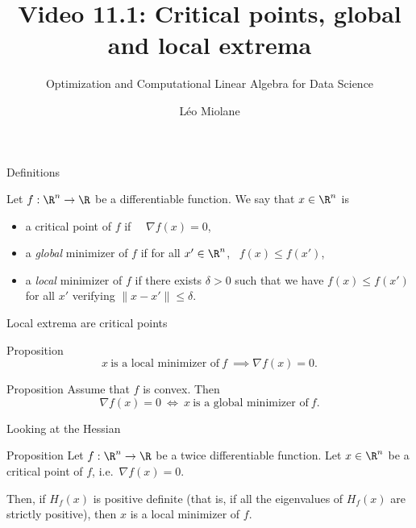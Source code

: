 \documentclass{beamer}
\title{Video 11.1: Critical points, global and local extrema}
\subtitle{Optimization and Computational Linear Algebra for Data Science}
\author{Léo Miolane}
\date{}
\begin{document}
\setcounter{showProgressBar}{0}
\setcounter{showSlideNumbers}{0}

\frame{\titlepage}
\setcounter{framenumber}{0}
\setcounter{showSlideNumbers}{1}




\begin{frame}[t]{Definitions}
	\grid

	\vspace{-0.2cm}
	\begin{definition}
		Let $f: \R^n \to \R$ be a differentiable function.
		We say that $x \in \R^n$ is
		\begin{itemize}
			\item a critical point of $f$ if \ \ $\nabla f(x) = 0$,
			\item a \emph{global} minimizer of $f$ if for all $x' \in \R^n$, \ $f(x) \leq f(x')$,
			\item a \emph{local} minimizer of $f$ if there exists $\delta > 0$ such that we have $f(x) \leq f(x')$ for all $x'$ verifying $\|x-x'\| \leq \delta$.
		\end{itemize}

	\end{definition}

\end{frame}

\begin{frame}[t]{Local extrema are critical points}
	\grid

	\vspace{-0.2cm}
	\begin{block}{Proposition}
	\vspace{-0.2cm}
		$$
		x \ \text{is a local minimizer of} \ f \ \implies \nabla f(x) = 0.
		$$
	\end{block}

	\begin{block}{Proposition}
		Assume that $f$ is convex. Then
		$$
		\nabla f(x) = 0 \ \Longleftrightarrow \ x \ \text{is a global minimizer of} \ f.
		$$
	\end{block}

\end{frame}

\begin{frame}[t]{Looking at the Hessian}
	\grid

	\vspace{-0.2cm}
	\begin{block}{Proposition}
	Let $f:\R^n \to \R$ be a twice differentiable function. Let $x \in \R^n$ be a critical point of $f$, i.e.\ $\nabla f(x) = 0$. 

	Then, if $H_f(x)$ is positive definite (that is, if all the eigenvalues of $H_f(x)$ are strictly positive), then $x$ is a local minimizer of $f$.
	\end{block}

\end{frame}
\end{document}
